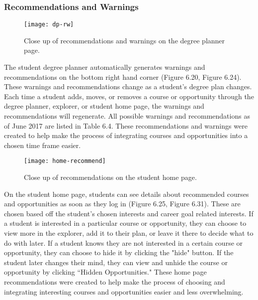 \subsubsection{Recommendations and Warnings}
\begin{figure}[htbp!]
\centering
\texttt{[image: dp-rw]}
\caption{Close up of recommendations and warnings on the degree planner page.}
\end{figure}

The student degree planner automatically generates warnings and recommendations on the bottom right hand corner (Figure 6.20, Figure 6.24). These warnings and recommendations change as a student's degree plan changes. Each time a student adds, moves, or removes a course or opportunity through the degree planner, explorer, or student home page, the warnings and recommendations will regenerate. All possible warnings and recommendations as of June 2017 are listed in Table 6.4. These recommendations and warnings were created to help make the process of integrating courses and opportunities into a chosen time frame easier.

\begin{figure}[htbp!]
\centering
\texttt{[image: home-recommend]}
\caption{Close up of recommendations on the student home page.}
\end{figure}

On the student home page, students can see details about recommended courses and opportunities as soon as they log in (Figure 6.25, Figure 6.31). These are chosen based off the student's chosen interests and career goal related interests. If a student is interested in a particular course or opportunity, they can choose to view more in the explorer, add it to their plan, or leave it there to decide what to do with later. If a student knows they are not interested in a certain course or opportunity, they can choose to hide it by clicking the "hide" button. If the student later changes their mind, they can view and unhide the course or opportunity by clicking ``Hidden Opportunities." These home page recommendations were created to help make the process of choosing and integrating interesting courses and opportunities easier and less overwhelming.


